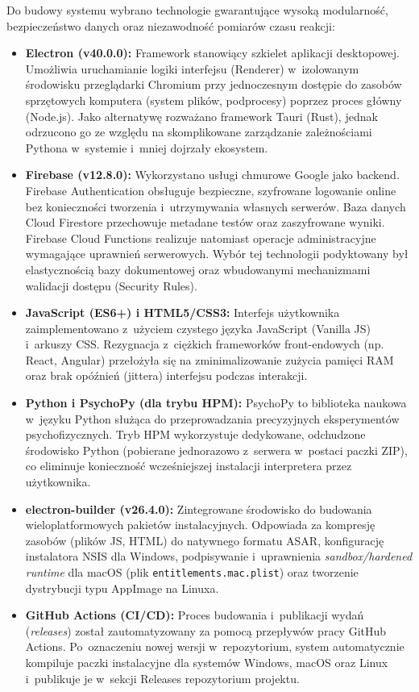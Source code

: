 \documentclass[12pt, a4paper, oneside]{report}
\begin{document}
Do budowy systemu wybrano technologie gwarantujące wysoką modularność, bezpieczeństwo danych oraz niezawodność pomiarów czasu reakcji:
\begin{itemize}
	\item \textbf{Electron (v40.0.0):} Framework stanowiący szkielet aplikacji desktopowej. Umożliwia uruchamianie logiki interfejsu (Renderer) w~izolowanym środowisku przeglądarki Chromium przy jednoczesnym dostępie do zasobów sprzętowych komputera (system plików, podprocesy) poprzez proces główny (Node.js). Jako alternatywę rozważano framework Tauri (Rust), jednak odrzucono go ze względu na skomplikowane zarządzanie zależnościami Pythona w~systemie i~mniej dojrzały ekosystem.
	\item \textbf{Firebase (v12.8.0):} Wykorzystano usługi chmurowe Google jako backend. Firebase Authentication obsługuje bezpieczne, szyfrowane logowanie online bez konieczności tworzenia i~utrzymywania własnych serwerów. Baza danych Cloud Firestore przechowuje metadane testów oraz zaszyfrowane wyniki. Firebase Cloud Functions realizuje natomiast operacje administracyjne wymagające uprawnień serwerowych. Wybór tej technologii podyktowany był elastycznością bazy dokumentowej oraz wbudowanymi mechanizmami walidacji dostępu (Security Rules).
	\item \textbf{JavaScript (ES6+) i HTML5/CSS3:} Interfejs użytkownika zaimplementowano z~użyciem czystego języka JavaScript (Vanilla JS) i~arkuszy CSS. Rezygnacja z~ciężkich frameworków front-endowych (np. React, Angular) przełożyła się na zminimalizowanie zużycia pamięci RAM oraz brak opóźnień (jittera) interfejsu podczas interakcji.
	\item \textbf{Python i PsychoPy (dla trybu HPM):} PsychoPy to biblioteka naukowa w~języku Python służąca do przeprowadzania precyzyjnych eksperymentów psychofizycznych. Tryb HPM wykorzystuje dedykowane, odchudzone środowisko Python (pobierane jednorazowo z~serwera w~postaci paczki ZIP), co eliminuje konieczność wcześniejszej instalacji interpretera przez użytkownika.
	\item \textbf{electron-builder (v26.4.0):} Zintegrowane środowisko do budowania wieloplatformowych pakietów instalacyjnych. Odpowiada za kompresję zasobów (plików JS, HTML) do natywnego formatu ASAR, konfigurację instalatora NSIS dla Windows, podpisywanie i~uprawnienia \textit{sandbox/hardened runtime} dla macOS (plik \texttt{entitlements.mac.plist}) oraz tworzenie dystrybucji typu AppImage na Linuxa.
	\item \textbf{GitHub Actions (CI/CD):} Proces budowania i~publikacji wydań (\textit{releases}) został zautomatyzowany za pomocą przepływów pracy GitHub Actions. Po~oznaczeniu nowej wersji w~repozytorium, system automatycznie kompiluje paczki instalacyjne dla systemów Windows, macOS oraz Linux i~publikuje je w~sekcji Releases repozytorium projektu.
\end{itemize}
\end{document}
